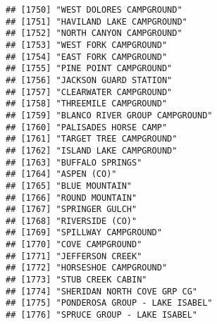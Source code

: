 \documentclass[
]{article}
\begin{document}
\begin{verbatim}
## [1750] "WEST DOLORES CAMPGROUND"                                                             
## [1751] "HAVILAND LAKE CAMPGROUND"                                                            
## [1752] "NORTH CANYON CAMPGROUND"                                                             
## [1753] "WEST FORK CAMPGROUND"                                                                
## [1754] "EAST FORK CAMPGROUND"                                                                
## [1755] "PINE POINT CAMPGROUND"                                                               
## [1756] "JACKSON GUARD STATION"                                                               
## [1757] "CLEARWATER CAMPGROUND"                                                               
## [1758] "THREEMILE CAMPGROUND"                                                                
## [1759] "BLANCO RIVER GROUP CAMPGROUND"                                                       
## [1760] "PALISADES HORSE CAMP"                                                                
## [1761] "TARGET TREE CAMPGROUND"                                                              
## [1762] "ISLAND LAKE CAMPGROUND"                                                              
## [1763] "BUFFALO SPRINGS"                                                                     
## [1764] "ASPEN (CO)"                                                                          
## [1765] "BLUE MOUNTAIN"                                                                       
## [1766] "ROUND MOUNTAIN"                                                                      
## [1767] "SPRINGER GULCH"                                                                      
## [1768] "RIVERSIDE (CO)"                                                                      
## [1769] "SPILLWAY CAMPGROUND"                                                                 
## [1770] "COVE CAMPGROUND"                                                                     
## [1771] "JEFFERSON CREEK"                                                                     
## [1772] "HORSESHOE CAMPGROUND"                                                                
## [1773] "STUB CREEK CABIN"                                                                    
## [1774] "SHERIDAN NORTH COVE GRP CG"                                                          
## [1775] "PONDEROSA GROUP - LAKE ISABEL"                                                       
## [1776] "SPRUCE GROUP - LAKE ISABEL"                                                          

\end{verbatim}
\end{document}

